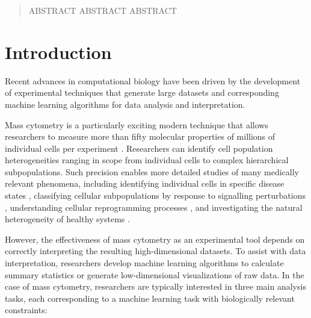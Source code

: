 \documentclass{article}
\begin{document}
 


\begin{abstract} 
ABSTRACT ABSTRACT ABSTRACT
\end{abstract} 

\section{Introduction}
\label{sec:introduction}
Recent advances in computational biology have been driven by the development of experimental techniques that generate large datasets and corresponding machine learning algorithms for data analysis and interpretation.  

Mass cytometry is a particularly exciting modern technique that allows researchers to measure more than fifty molecular properties of millions of individual cells per experiment \cite{}.  Researchers can identify cell population heterogeneities ranging in scope from individual cells to complex hierarchical subpopulations. Such precision enables more detailed studies of many medically relevant phenomena, including identifying individual cells in specific disease states \cite{}, classifying cellular subpopulations by response to signalling perturbations \cite{}, understanding cellular reprogramming processes \cite{}, and investigating the natural heterogeneity of healthy systems \cite{}.  

However, the effectiveness of mass cytometry as an experimental tool depends on correctly interpreting the resulting high-dimensional datasets. To assist with data interpretation, researchers develop machine learning algorithms to calculate summary statistics or generate low-dimensional visualizations of raw data. In the case of mass cytometry, researchers are typically interested in three main analysis tasks, each corresponding to a machine learning task with biologically relevant constraints:
\end{document}
